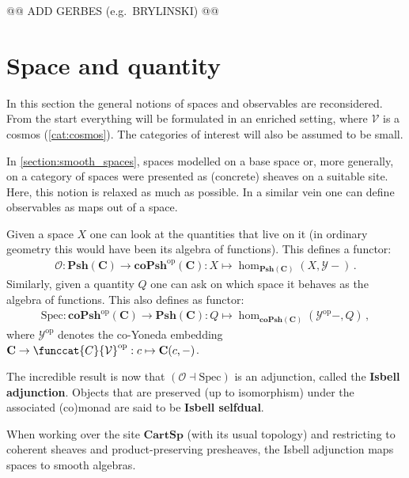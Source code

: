     @@ ADD GERBES (e.g.~BRYLINSKI) @@

\section{Space and quantity}

    In this section the general notions of spaces and observables are reconsidered. From the start everything will be formulated in an enriched setting, where $\mathcal{V}$ is a cosmos (\cref{cat:cosmos}). The categories of interest will also be assumed to be small.

    In \cref{section:smooth_spaces}, spaces modelled on a base space or, more generally, on a category of spaces were presented as (concrete) sheaves on a suitable site. Here, this notion is relaxed as much as possible.
    In a similar vein one can define observables as maps out of a space.

    \begin{property}
        Given a space $X$ one can look at the quantities that live on it (in ordinary geometry this would have been its algebra of functions). This defines a functor:
        \begin{gather}
            \mathcal{O}:\mathbf{Psh(C)}\rightarrow\mathbf{coPsh}^{\text{op}}(\mathbf{C}):X\mapsto\hom_{\mathbf{Psh(C)}}(X,\mathcal{Y}-)\,.
        \end{gather}
        Similarly, given a quantity $Q$ one can ask on which space it behaves as the algebra of functions. This also defines as functor:
        \begin{gather}
            \mathrm{Spec}:\mathbf{coPsh}^{\text{op}}(\mathbf{C})\rightarrow\mathbf{Psh(C)}:Q\mapsto\hom_{\mathbf{coPsh(C)}}(\mathcal{Y}^{\text{op}}-,Q)\,,
        \end{gather}
        where $\mathcal{Y}^{\text{op}}$ denotes the co-Yoneda embedding $\mathbf{C}\rightarrow\funccat{C}{\mathcal{V}}^{\text{op}}:c\mapsto\mathbf{C}(c,-)$.

        The incredible result is now that $(\mathcal{O}\dashv\mathrm{Spec})$ is an adjunction, called the \textbf{Isbell adjunction}. Objects that are preserved (up to isomorphism) under the associated (co)monad are said to be \textbf{Isbell selfdual}.
    \end{property}

    \begin{example}
        When working over the site $\mathbf{CartSp}$ (with its usual topology) and restricting to coherent sheaves and product-preserving presheaves, the Isbell adjunction maps spaces to smooth algebras.
    \end{example}